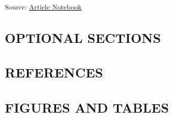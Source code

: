 \documentclass[
]{agujournal2019}
\begin{document}
\begin{longtable}[]{@{}lrrrrrr@{}}
\end{longtable}

\textsubscript{Source:
\href{https://rvcrawford.github.io/glowing-system/index.qmd.html}{Article
Notebook}}

\subsection{OPTIONAL SECTIONS}\label{optional-sections}

\subsection{REFERENCES}\label{references}

\subsection*{FIGURES AND TABLES}\label{figures-and-tables}
\end{document}
